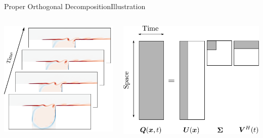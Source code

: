 \documentclass[usenames,dvipsnames,svgnames,10pt,aspectratio=169]{beamer}
\begin{document}
\begin{frame}[t, c]{Proper Orthogonal Decomposition}{Illustration}
	\centering
	\begin{columns}
		\begin{column}{.33\textwidth}
			\centering
			\includegraphics[width=\columnwidth]{dimensionality_reduction}
		\end{column}
		\begin{column}{.4\textwidth}
			\centering
			\includegraphics[width=\columnwidth]{svd}
		\end{column}
	\end{columns}

	\vspace{1cm}
\end{frame}
\end{document}
